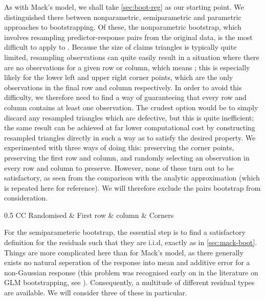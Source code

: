 \documentclass[a4paper]{book}
\begin{document}
As with Mack's model, we shall take \cref{sec:boot-reg} as our starting point. We distinguished there between nonparametric, semiparametric and parametric approaches to bootstrapping. Of these, the nonparametric bootstrap, which involves resampling predictor-response pairs from the original data, is the most difficult to apply to . Because the size of claims triangles is typically quite limited, resampling observations can quite easily result in a situation where there are no observations for a given row or column, which means ; this is especially likely for the lower left and upper right corner points, which are the only observations in the final row and column respectively. In order to avoid this difficulty, we therefore need to find a way of guaranteeing that every row and column contains at least one observation. The crudest option would be to simply discard any resampled triangles which are defective, but this is quite inefficient; the same result can be achieved at far lower computational cost by constructing resampled triangles directly in such a way as to satisfy the desired property. We experimented with three ways of doing this: preserving the corner points, preserving the first row and column, and randomly selecting an observation in every row and column to preserve. However, none of these turn out to be satisfactory, as seen from the comparison with the analytic approximation (which is repeated here for reference). We will therefore exclude the pairs bootstrap from consideration. 

\begin{table}
  \centering
  \begin{tabularx}{0.5 \linewidth}{CC \mcol{3em} \mcol{3em} \mcol{4em}}\toprule
    Randomised  & First row \& column & Corners \\ \midrule
     \bottomrule
  \end{tabularx}
  \caption{Results for semiparameteric bootstrap with deviance residuals}
  \label{tab:semiparam-pois-dev-res}
\end{table}


For the semiparameteric bootstrap, the essential step is to find a satisfactory definition for the residuals such that they are i.i.d, exactly as in \cref{sec:mack-boot}. Things are more complicated here than for Mack's model, as there generally exists no natural seperation of the response into mean and additive error for a non-Gaussian response (this problem was recognised early on in the literature on GLM bootstrapping, see \cite{moulton}). Consequently, a multitude of different residual types are available. We will consider three of these in particular.
\end{document}
